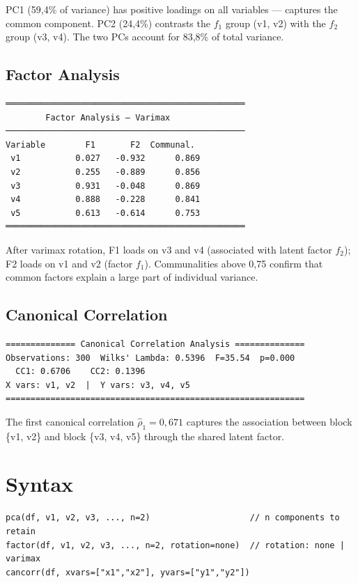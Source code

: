 PC1 (59{,}4\% of variance) has positive loadings on all variables —
captures the common component. PC2 (24{,}4\%) contrasts the $f_1$ group (v1, v2)
with the $f_2$ group (v3, v4). The two PCs account for 83{,}8\% of total variance.

\subsection*{Factor Analysis}

\begin{lstlisting}[language={}, basicstyle=\ttfamily\small,
  frame=none, numbers=none, backgroundcolor=\color{codbg},
  xleftmargin=0pt, xrightmargin=0pt, breaklines=false]
════════════════════════════════════════════════
        Factor Analysis — Varimax
────────────────────────────────────────────────
Variable        F1       F2  Communal.
 v1           0.027   -0.932      0.869
 v2           0.255   -0.889      0.856
 v3           0.931   -0.048      0.869
 v4           0.888   -0.228      0.841
 v5           0.613   -0.614      0.753
════════════════════════════════════════════════
\end{lstlisting}

After varimax rotation, F1 loads on v3 and v4 (associated with latent factor
$f_2$); F2 loads on v1 and v2 (factor $f_1$). Communalities above 0{,}75
confirm that common factors explain a large part of individual variance.

\subsection*{Canonical Correlation}

\begin{lstlisting}[language={}, basicstyle=\ttfamily\small,
  frame=none, numbers=none, backgroundcolor=\color{codbg},
  xleftmargin=0pt, xrightmargin=0pt, breaklines=false]
============== Canonical Correlation Analysis ==============
Observations: 300  Wilks' Lambda: 0.5396  F=35.54  p=0.000
  CC1: 0.6706    CC2: 0.1396
X vars: v1, v2  |  Y vars: v3, v4, v5
============================================================
\end{lstlisting}

The first canonical correlation $\hat\rho_1 = 0{,}671$ captures the association
between block \{v1, v2\} and block \{v3, v4, v5\} through the shared latent factor.

\section{Syntax}

\begin{lstlisting}
pca(df, v1, v2, v3, ..., n=2)                    // n components to retain
factor(df, v1, v2, v3, ..., n=2, rotation=none)  // rotation: none | varimax
cancorr(df, xvars=["x1","x2"], yvars=["y1","y2"])
\end{lstlisting}
